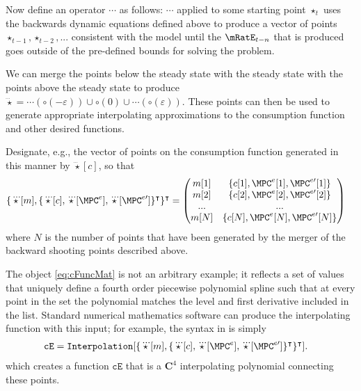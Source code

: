 \documentclass{\handout}
\begin{document}
Now define an operator $\cdots$ as follows: $\cdots$ applied to some
starting point $\star_{t}$ uses the backwards dynamic equations
defined above to produce a vector of points
$\star_{t-1},\star_{t-2},...$ consistent with the model until the
$\mRatE_{t-n}$ that is produced goes outside of the pre-defined bounds
for solving the problem.

We can merge the points below the steady state with the steady state
with the points above the steady state to produce $\dddot{\star} =
\cdots(\pmb{\circ}(-\varepsilon)) \cup \pmb{\circ}(0) \cup
\cdots(\pmb{\circ}(\varepsilon)) $.  These points can then be used to
generate appropriate interpolating approximations to the consumption
function and other desired functions.

Designate, e.g., the vector of points on the consumption function
generated in this manner by $\dddot{\star}[c]$, so that 
\begin{equation}\begin{gathered}\begin{aligned}
   \{\dddot{\star}[m],\{\dddot{\star}[c],\dddot{\star}[\MPC^{e}],\dddot{\star}[\MPC^{e\prime}]\}^{\intercal}\}^{\intercal} & =  
\begin{pmatrix}
m[1] & \{c[1],\MPC^{e}[1],\MPC^{e\prime}[1]\} \\
m[2] & \{c[2],\MPC^{e}[2],\MPC^{e\prime}[2]\} \\
...  & ...              \\
m[N] & \{c[N],\MPC^{e}[N],\MPC^{e\prime}[N]\} \\
\end{pmatrix} \label{eq:cFuncMat}
\end{aligned}\end{gathered}\end{equation}
where $N$ is the number of points that have been generated by the merger of the backward
shooting points described above.  

The object \eqref{eq:cFuncMat} is not an arbitrary example; it reflects a set of values that 
uniquely define a fourth order piecewise polynomial spline such that at every point in the 
set the polynomial matches the level and first derivative included in the list.  Standard
numerical mathematics software can produce the interpolating function with this input; 
for example, the syntax in \Mma is simply
\begin{equation}\begin{gathered}\begin{aligned}
  \mathtt{cE} & =  \mathtt{Interpolation}[\{\dddot{\star}[m],\{\dddot{\star}[c],\dddot{\star}[\MPC^{e}],\dddot{\star}[\MPC^{e\prime}]\}^{\intercal}\}^{\intercal}].
\end{aligned}\end{gathered}\end{equation}
which creates a function $\texttt{cE}$ that is a $\mathbf{C}^4$ interpolating polynomial
connecting these points.
\end{document}
